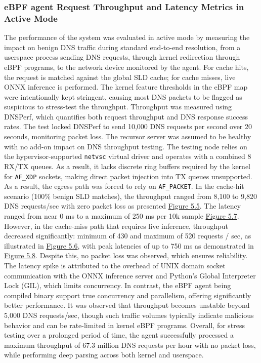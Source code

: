 \documentclass [11pt, proquest] {uwthesis}[2020/02/24]
\begin{document}
\subsubsection{eBPF agent Request Throughput and Latency Metrics in Active Mode}
The performance of the system was evaluated in active mode by measuring the impact on benign DNS traffic during standard end-to-end resolution, from a userspace process sending DNS requests, through kernel redirection through eBPF programs, to the network device monitored by the agent. For cache hits, the request is matched against the global SLD cache; for cache misses, live ONNX inference is performed. The kernel feature thresholds in the eBPF map were intentionally kept stringent, causing most DNS packets to be flagged as suspicious to stress-test the throughput. Throughput was measured using DNSPerf, which quantifies both request throughput and DNS response success rates. The test locked DNSPerf to send 10,000 DNS requests per second over 20 seconds, monitoring packet loss. The recursor server was assumed to be healthy with no add-on impact on DNS throughput testing. The testing node relies on the hypervisor-supported \texttt{netvsc} virtual driver and operates with a combined 8 RX/TX queues. As a result, it lacks discrete ring buffers required by the kernel for \texttt{AF\_XDP} sockets, making direct packet injection into TX queues unsupported. As a result, the egress path was forced to rely on \texttt{AF\_PACKET}. In the cache-hit scenario (100\% benign SLD matches), the throughput ranged from 8,100 to 9,820 DNS requests/sec with zero packet loss as presented \hyperref[fig:throughput_gsld]{Figure 5.5}. The latency ranged from near 0 ms to a maximum of 250 ms per 10k sample \hyperlink{fig:latency_gsld}{Figure 5.7}. However, in the cache-miss path that requires live inference, throughput decreased significantly: minimum of 430 and maximum of 520 requests / sec, as illustrated in \hyperref[fig:throughput_onnx]{Figure 5.6}, with peak latencies of up to 750 ms as demonstrated in \hyperref[fig:latency_onnx]{Figure 5.8}. Despite this, no packet loss was observed, which ensures reliability. The latency spike is attributed to the overhead of UNIX domain socket communication with the ONNX inference server and Python’s Global Interpreter Lock (GIL), which limits concurrency. In contrast, the eBPF agent being compiled binary support true concurrency and parallelism, offering significantly better performance.
It was observed that throughput becomes unstable beyond 5,000 DNS requests/sec, though such traffic volumes typically indicate malicious behavior and can be rate-limited in kernel eBPF programs. Overall, for stress testing over a prolonged period of time, the agent successfully processed a maximum throughput of 67.3 million DNS requests per hour with no packet loss, while performing deep parsing across both kernel and userspace.
\end{document}
